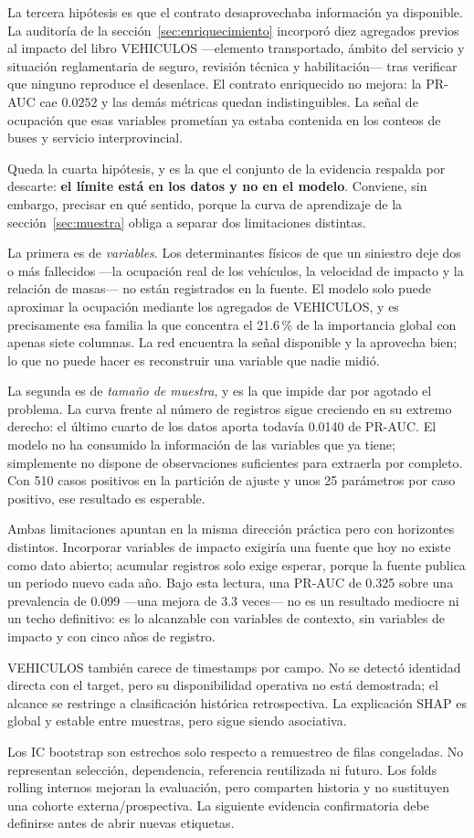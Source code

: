La tercera hipótesis es que el contrato desaprovechaba información ya disponible. La auditoría de la sección~\ref{sec:enriquecimiento} incorporó diez agregados previos al impacto del libro VEHICULOS ---elemento transportado, ámbito del servicio y situación reglamentaria de seguro, revisión técnica y habilitación--- tras verificar que ninguno reproduce el desenlace. El contrato enriquecido no mejora: la PR-AUC cae $0.0252$ y las demás métricas quedan indistinguibles. La señal de ocupación que esas variables prometían ya estaba contenida en los conteos de buses y servicio interprovincial.

Queda la cuarta hipótesis, y es la que el conjunto de la evidencia respalda por descarte: \textbf{el límite está en los datos y no en el modelo}. Conviene, sin embargo, precisar en qué sentido, porque la curva de aprendizaje de la sección~\ref{sec:muestra} obliga a separar dos limitaciones distintas.

La primera es de \emph{variables}. Los determinantes físicos de que un siniestro deje dos o más fallecidos ---la ocupación real de los vehículos, la velocidad de impacto y la relación de masas--- no están registrados en la fuente. El modelo solo puede aproximar la ocupación mediante los agregados de VEHICULOS, y es precisamente esa familia la que concentra el 21.6\,\% de la importancia global con apenas siete columnas. La red encuentra la señal disponible y la aprovecha bien; lo que no puede hacer es reconstruir una variable que nadie midió.

La segunda es de \emph{tamaño de muestra}, y es la que impide dar por agotado el problema. La curva frente al número de registros sigue creciendo en su extremo derecho: el último cuarto de los datos aporta todavía 0.0140 de PR-AUC. El modelo no ha consumido la información de las variables que ya tiene; simplemente no dispone de observaciones suficientes para extraerla por completo. Con 510 casos positivos en la partición de ajuste y unos 25 parámetros por caso positivo, ese resultado es esperable.

Ambas limitaciones apuntan en la misma dirección práctica pero con horizontes distintos. Incorporar variables de impacto exigiría una fuente que hoy no existe como dato abierto; acumular registros solo exige esperar, porque la fuente publica un periodo nuevo cada año. Bajo esta lectura, una PR-AUC de 0.325 sobre una prevalencia de 0.099 ---una mejora de 3.3 veces--- no es un resultado mediocre ni un techo definitivo: es lo alcanzable con variables de contexto, sin variables de impacto y con cinco años de registro.

VEHICULOS también carece de timestamps por campo. No se detectó identidad directa con el target, pero su disponibilidad operativa no está demostrada; el alcance se restringe a clasificación histórica retrospectiva. La explicación SHAP es global y estable entre muestras, pero sigue siendo asociativa.

Los IC bootstrap son estrechos solo respecto a remuestreo de filas congeladas. No representan selección, dependencia, referencia reutilizada ni futuro. Los folds rolling internos mejoran la evaluación, pero comparten historia y no sustituyen una cohorte externa/prospectiva. La siguiente evidencia confirmatoria debe definirse antes de abrir nuevas etiquetas.
